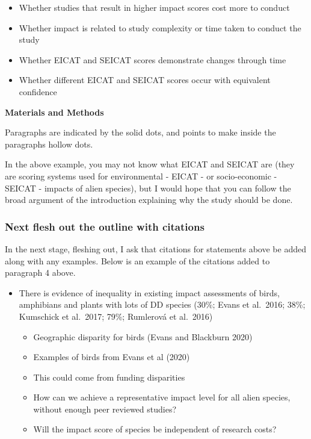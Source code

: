 \documentclass[
]{krantz}
\providecommand{\tightlist}{%
  \setlength{\itemsep}{0pt}\setlength{\parskip}{0pt}}
\begin{document}
\begin{itemize}
  \begin{itemize}
  \tightlist
  \item
    Whether studies that result in higher impact scores cost more to conduct
  \item
    Whether impact is related to study complexity or time taken to conduct the study
  \item
    Whether EICAT and SEICAT scores demonstrate changes through time
  \item
    Whether different EICAT and SEICAT scores occur with equivalent confidence
  \end{itemize}
\end{itemize}

\textbf{Materials and Methods}

Paragraphs are indicated by the solid dots, and points to make inside the paragraphs hollow dots.

In the above example, you may not know what EICAT and SEICAT are (they are scoring systems used for environmental - EICAT - or socio-economic - SEICAT - impacts of alien species), but I would hope that you can follow the broad argument of the introduction explaining why the study should be done.

\hypertarget{next-flesh-out-the-outline-with-citations}{%
\subsubsection{Next flesh out the outline with citations}\label{next-flesh-out-the-outline-with-citations}}

In the next stage, fleshing out, I ask that citations for statements above be added along with any examples. Below is an example of the citations added to paragraph 4 above.

\begin{itemize}
\tightlist
\item
  There is evidence of inequality in existing impact assessments of birds, amphibians and plants with lots of DD species (30\%; Evans et al.~2016; 38\%; Kumschick et al.~2017; 79\%; Rumlerová et al.~2016)

  \begin{itemize}
  \tightlist
  \item
    Geographic disparity for birds (Evans and Blackburn 2020)
  \item
    Examples of birds from Evans et al (2020)
  \item
    This could come from funding disparities
  \item
    How can we achieve a representative impact level for all alien species, without enough peer reviewed studies?
  \item
    Will the impact score of species be independent of research costs?
  \end{itemize}
\end{itemize}
\end{document}
